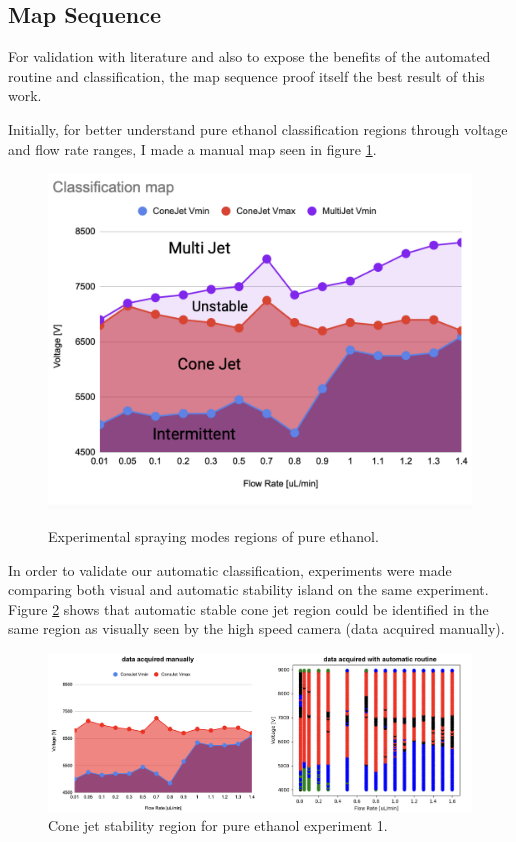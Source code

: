 \subsection{Map Sequence}
\label{subsec:map_results}

For validation with literature and also to expose the benefits of the automated routine and classification, the map sequence proof itself the best result of this work.

    Initially, for better understand pure ethanol classification regions through voltage and flow rate ranges, I made a manual map seen in figure \ref{fig:stability_1}.

    \begin{figure}[H]
        \center
        \includegraphics[width=12cm]{Figuras/regions.png}
        \label{fig:stability_1}
        \caption{Experimental spraying modes regions of pure ethanol.}
    \end{figure}


    In order to validate our automatic classification, experiments were made comparing both visual and automatic stability island on the same experiment.
    Figure \ref{fig:stability_2} shows that automatic stable cone jet region could be identified in the same region as visually seen by the high speed camera (data acquired manually).

        \begin{figure}[H]
            \center
            \includegraphics[width=16cm]{Figuras/april/manual_stability_island.png}
            \caption{Cone jet stability region for pure ethanol experiment 1.}
            \label{fig:stability_2}
        \end{figure}


